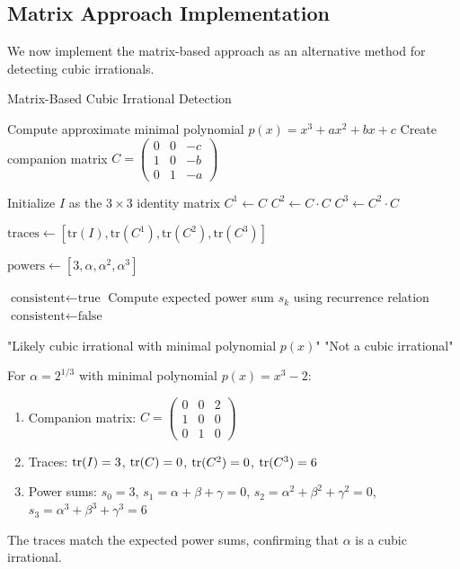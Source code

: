 \subsection{Matrix Approach Implementation}

We now implement the matrix-based approach as an alternative method for detecting cubic irrationals.

\begin{algorithm}
\caption{Matrix-Based Cubic Irrational Detection}
\label{alg:matrix_detection}
\begin{algorithmic}[1]
    \State Compute approximate minimal polynomial $p(x) = x^3 + ax^2 + bx + c$
    \State Create companion matrix $C = \begin{pmatrix} 0 & 0 & -c \\ 1 & 0 & -b \\ 0 & 1 & -a \end{pmatrix}$
    
    \State Initialize $I$ as the $3 \times 3$ identity matrix
    \State $C^1 \gets C$
    \State $C^2 \gets C \cdot C$
    \State $C^3 \gets C^2 \cdot C$
    
    \State $\text{traces} \gets [\text{tr}(I), \text{tr}(C^1), \text{tr}(C^2), \text{tr}(C^3)]$
    
    \State $\text{powers} \gets [3, \alpha, \alpha^2, \alpha^3]$
    
    \State $\text{consistent} \gets \text{true}$
        \State Compute expected power sum $s_k$ using recurrence relation
            \State $\text{consistent} \gets \text{false}$
        \EndIf
    \EndFor
    
        \State \Return "Likely cubic irrational with minimal polynomial $p(x)$"
    \Else
        \State \Return "Not a cubic irrational"
    \EndIf
\EndProcedure
\end{algorithmic}
\end{algorithm}

\begin{example}
For $\alpha = 2^{1/3}$ with minimal polynomial $p(x) = x^3 - 2$:
\begin{enumerate}
    \item Companion matrix: $C = \begin{pmatrix} 0 & 0 & 2 \\ 1 & 0 & 0 \\ 0 & 1 & 0 \end{pmatrix}$
    \item Traces: $\operatorname{tr}(I) = 3$, $\operatorname{tr}(C) = 0$, $\operatorname{tr}(C^2) = 0$, $\operatorname{tr}(C^3) = 6$
    \item Power sums: $s_0 = 3$, $s_1 = \alpha + \beta + \gamma = 0$, $s_2 = \alpha^2 + \beta^2 + \gamma^2 = 0$, $s_3 = \alpha^3 + \beta^3 + \gamma^3 = 6$
\end{enumerate}

The traces match the expected power sums, confirming that $\alpha$ is a cubic irrational.
\end{example}

